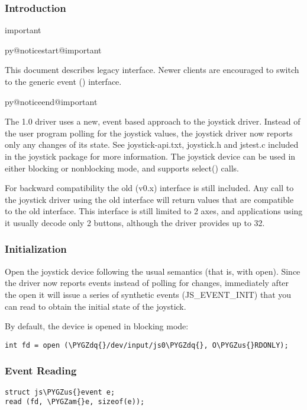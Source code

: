 \documentclass[a4paper,8pt,english]{sphinxmanual}
\makeatletter
\renewenvironment{notice}[2]{%
          \def\py@noticetype{#1}
          \begin{coloredbox}{#1}
          \bf\it
          \par\strong{#2}
          \csname py@noticestart@#1\endcsname
        }
	{
          \csname py@noticeend@\py@noticetype\endcsname
          \end{coloredbox}
        }
\def\PYGZus{\char`\_}
\def\PYGZam{\char`\&}
\def\PYGZdq{\char`\"}
\makeatother
\begin{document}
\subsubsection{Introduction}
\label{input/joydev/joystick-api:introduction}
\begin{notice}{important}{Important:}
This document describes legacy  interface. Newer clients are
encouraged to switch to the generic event () interface.
\end{notice}

The 1.0 driver uses a new, event based approach to the joystick driver.
Instead of the user program polling for the joystick values, the joystick
driver now reports only any changes of its state. See joystick-api.txt,
joystick.h and jstest.c included in the joystick package for more
information. The joystick device can be used in either blocking or
nonblocking mode, and supports select() calls.

For backward compatibility the old (v0.x) interface is still included.
Any call to the joystick driver using the old interface will return values
that are compatible to the old interface. This interface is still limited
to 2 axes, and applications using it usually decode only 2 buttons, although
the driver provides up to 32.


\subsubsection{Initialization}
\label{input/joydev/joystick-api:initialization}
Open the joystick device following the usual semantics (that is, with open).
Since the driver now reports events instead of polling for changes,
immediately after the open it will issue a series of synthetic events
(JS\_EVENT\_INIT) that you can read to obtain the initial state of the
joystick.

By default, the device is opened in blocking mode:

\begin{Verbatim}[commandchars=\\\{\}]
int fd = open (\PYGZdq{}/dev/input/js0\PYGZdq{}, O\PYGZus{}RDONLY);
\end{Verbatim}


\subsubsection{Event Reading}
\label{input/joydev/joystick-api:event-reading}
\begin{Verbatim}[commandchars=\\\{\}]
struct js\PYGZus{}event e;
read (fd, \PYGZam{}e, sizeof(e));
\end{Verbatim}
\end{document}
